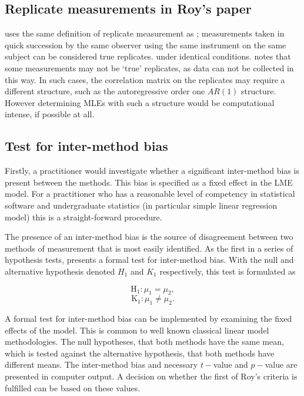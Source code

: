 \documentclass[12pt, a4paper]{report}
\theoremstyle{plain}
\theoremstyle{definition}
\theoremstyle{remark}
\begin{document}
	\subsection{Replicate measurements in Roy's paper}
	
	
	\citet{ARoy2009} uses the same definition of replicate measurement as \citet{BA99}; 	measurements taken in quick succession by the same observer using the same instrument on the same subject can be considered true replicates.
	under identical conditions. \citet{ARoy2009} notes that some measurements may not be `true' replicates, as data can not be collected in this way. In such cases, the correlation matrix on the replicates may require a different structure, such as the autoregressive order one $AR(1)$ structure. However determining MLEs with such a structure would be computational intense, if possible at all.
	
	
	

	\subsection{Test for inter-method bias}
	
	Firstly, a practitioner would investigate whether a significant inter-method bias is present between the methods. This bias is specified as a fixed effect in the LME model.  For a practitioner who has a reasonable level of competency in statistical software and undergraduate statistics (in particular simple linear regression model) this is a straight-forward procedure.
	
	The presence of an inter-method bias is the source of disagreement between two methods of measurement that is most easily identified. As the first in a series of hypothesis tests, \citet{ARoy2009} presents a formal test for inter-method bias. With the null and alternative hypothesis denoted $H_1$ and $K_1$ respectively, this test is formulated as
	
	\[	\operatorname{H_1} : \mu_1 = \mu_2 ,\]
	\[	\operatorname{K_1} : \mu_1 \neq \mu_2.\]
	
	
	
	
	A formal test for inter-method bias can be implemented by examining the fixed effects of the model. This is common to well known classical linear model methodologies. The null hypotheses, that both methods have the same mean, which is tested against the alternative hypothesis, that both methods have different means.
	The inter-method bias and necessary $t-$value and $p-$value are presented in computer output. A decision on whether the first of Roy's criteria is fulfilled can be based on these values.
	
\end{document}

